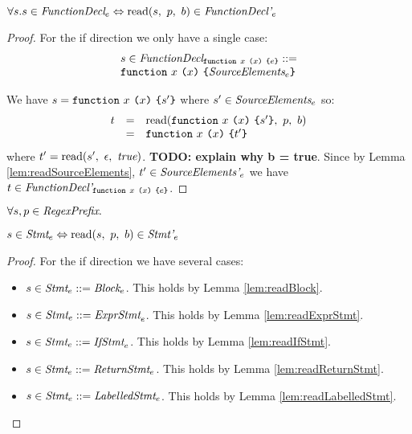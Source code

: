 \documentclass[preprint,10pt]{sigplanconf}
\begin{document}
\begin{lemma}\mbox{}
  
  \( \forall s. s \in \textit{FunctionDecl}_{e} \Leftrightarrow 
  \textrm{read}(s,~p,~b) \in \textit{FunctionDecl'}_{e} \)
\end{lemma}
\begin{proof}
  For the if direction we only have a single case: 
  \[ 
  \begin{array}{lcl}
  s \in
  \textit{FunctionDecl}_{\texttt{function}~x~\texttt{(}x\texttt{)}~\texttt{\{}e\texttt{\}}}
  ::= 
  \\
  \texttt{function}~x~\texttt{(}x\texttt{)}~\texttt{\{}\textit{SourceElements}_{e}\texttt{\}}
  \end{array}
  \]

 We have \( s = \texttt{function}~x~\texttt{(}x\texttt{)}~\texttt{\{}s'\texttt{\}}
 \) where \( s' \in \textit{SourceElements}_{e} \) so:
 \[
 \begin{array}{rcl}
   t &=& \textrm{read}(\texttt{function}~x~\texttt{(}x\texttt{)}~\texttt{\{}s'\texttt{\}},~p,~b)
   \\
   &=& \texttt{function}~x~\texttt{(}x\texttt{)}~\texttt{\{}t'\texttt{\}}
 \end{array}
 \]
 where \( t' = \textrm{read}(s',~\epsilon,~\textit{true}) \). \textbf{TODO:
   explain why b = true}. Since by Lemma \ref{lem:readSourceElements},
 \( t' \in \textit{SourceElements'}_{e} \) we have \( t \in \textit{FunctionDecl'}_{\texttt{function}~x~\texttt{(}x\texttt{)}~\texttt{\{}e\texttt{\}}} \).
\end{proof}

\begin{lemma}\mbox{}
  
  \( \forall s, p \in \textit{RegexPrefix}. \)

  \( s \in \textit{Stmt}_{e} \Leftrightarrow 
  \textrm{read}(s,~p,~b) \in \textit{Stmt'}_{e} \)
\end{lemma}
\begin{proof}
  For the if direction we have several cases:
  \begin{itemize}
  \item \( s \in \textit{Stmt}_{e} ::= \textit{Block}_{e} \). This
    holds by Lemma \ref{lem:readBlock}.

  \item \( s \in \textit{Stmt}_{e} ::= \textit{ExprStmt}_{e} \). This
    holds by Lemma \ref{lem:readExprStmt}.

  \item \( s \in \textit{Stmt}_{e} ::= \textit{IfStmt}_{e} \). This
    holds by Lemma \ref{lem:readIfStmt}.

  \item \( s \in \textit{Stmt}_{e} ::= \textit{ReturnStmt}_{e} \). This
    holds by Lemma \ref{lem:readReturnStmt}.

  \item \( s \in \textit{Stmt}_{e} ::= \textit{LabelledStmt}_{e} \). This
    holds by Lemma \ref{lem:readLabelledStmt}.
  \end{itemize}
\end{proof}
\end{document}
